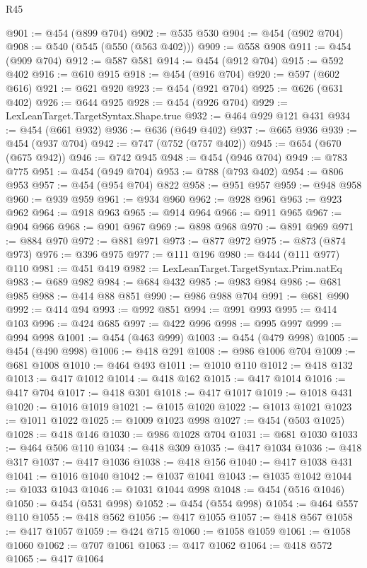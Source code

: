 \begin{lexlean}{R45}
\begin{coremodule}
@901 := @454 (@899 @704)
@902 := @535 @530
@904 := @454 (@902 @704)
@908 := @540 (@545 (@550 (@563 @402)))
@909 := @558 @908
@911 := @454 (@909 @704)
@912 := @587 @581
@914 := @454 (@912 @704)
@915 := @592 @402
@916 := @610 @915
@918 := @454 (@916 @704)
@920 := @597 (@602 @616)
@921 := @621 @920
@923 := @454 (@921 @704)
@925 := @626 (@631 @402)
@926 := @644 @925
@928 := @454 (@926 @704)
@929 := LexLeanTarget.TargetSyntax.Shape.true
@932 := @464 @929 @121 @431
@934 := @454 (@661 @932)
@936 := @636 (@649 @402)
@937 := @665 @936
@939 := @454 (@937 @704)
@942 := @747 (@752 (@757 @402))
@945 := @654 (@670 (@675 @942))
@946 := @742 @945
@948 := @454 (@946 @704)
@949 := @783 @775
@951 := @454 (@949 @704)
@953 := @788 (@793 @402)
@954 := @806 @953
@957 := @454 (@954 @704) @822
@958 := @951 @957
@959 := @948 @958
@960 := @939 @959
@961 := @934 @960
@962 := @928 @961
@963 := @923 @962
@964 := @918 @963
@965 := @914 @964
@966 := @911 @965
@967 := @904 @966
@968 := @901 @967
@969 := @898 @968
@970 := @891 @969
@971 := @884 @970
@972 := @881 @971
@973 := @877 @972
@975 := @873 (@874 @973)
@976 := @396 @975
@977 := @111 @196
@980 := @444 (@111 @977) @110
@981 := @451 @419
@982 := LexLeanTarget.TargetSyntax.Prim.natEq
@983 := @689 @982
@984 := @684 @432
@985 := @983 @984
@986 := @681 @985
@988 := @414 @88 @851
@990 := @986 @988 @704
@991 := @681 @990
@992 := @414 @94
@993 := @992 @851
@994 := @991 @993
@995 := @414 @103
@996 := @424 @685
@997 := @422 @996
@998 := @995 @997
@999 := @994 @998
@1001 := @454 (@463 @999)
@1003 := @454 (@479 @998)
@1005 := @454 (@490 @998)
@1006 := @418 @291
@1008 := @986 @1006 @704
@1009 := @681 @1008
@1010 := @464 @493
@1011 := @1010 @110
@1012 := @418 @132
@1013 := @417 @1012
@1014 := @418 @162
@1015 := @417 @1014
@1016 := @417 @704
@1017 := @418 @301
@1018 := @417 @1017
@1019 := @1018 @431
@1020 := @1016 @1019
@1021 := @1015 @1020
@1022 := @1013 @1021
@1023 := @1011 @1022
@1025 := @1009 @1023 @998
@1027 := @454 (@503 @1025)
@1028 := @418 @146
@1030 := @986 @1028 @704
@1031 := @681 @1030
@1033 := @464 @506 @110
@1034 := @418 @309
@1035 := @417 @1034
@1036 := @418 @317
@1037 := @417 @1036
@1038 := @418 @156
@1040 := @417 @1038 @431
@1041 := @1016 @1040
@1042 := @1037 @1041
@1043 := @1035 @1042
@1044 := @1033 @1043
@1046 := @1031 @1044 @998
@1048 := @454 (@516 @1046)
@1050 := @454 (@531 @998)
@1052 := @454 (@554 @998)
@1054 := @464 @557 @110
@1055 := @418 @562
@1056 := @417 @1055
@1057 := @418 @567
@1058 := @417 @1057
@1059 := @424 @715
@1060 := @1058 @1059
@1061 := @1058 @1060
@1062 := @707 @1061
@1063 := @417 @1062
@1064 := @418 @572
@1065 := @417 @1064

\end{coremodule}
\end{lexlean}
